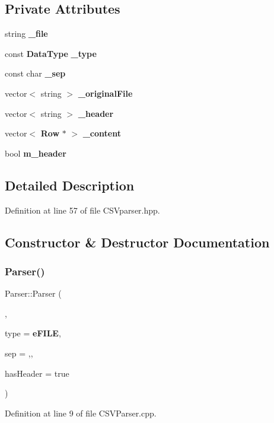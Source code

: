 \subsection*{Private Attributes}
\begin{DoxyCompactItemize}
\item 
string \textbf{ \+\_\+file}
\item 
const \textbf{ Data\+Type} \textbf{ \+\_\+type}
\item 
const char \textbf{ \+\_\+sep}
\item 
vector$<$ string $>$ \textbf{ \+\_\+original\+File}
\item 
vector$<$ string $>$ \textbf{ \+\_\+header}
\item 
vector$<$ \textbf{ Row} $\ast$ $>$ \textbf{ \+\_\+content}
\item 
bool \textbf{ m\+\_\+header}
\end{DoxyCompactItemize}


\subsection{Detailed Description}


Definition at line 57 of file C\+S\+Vparser.\+hpp.



\subsection{Constructor \& Destructor Documentation}
\mbox{\label{class_parser_acdb936b8a1723b1f342dfffbd6df310a}} 
\subsubsection{Parser()}
{\footnotesize\ttfamily Parser\+::\+Parser (\begin{DoxyParamCaption}\item[{const string \&}]{,  }\item[{const \textbf{ Data\+Type} \&}]{type = {\ttfamily \textbf{ e\+F\+I\+LE}},  }\item[{char}]{sep = {\ttfamily \textquotesingle{},\textquotesingle{}},  }\item[{bool}]{has\+Header = {\ttfamily true} }\end{DoxyParamCaption})}



Definition at line 9 of file C\+S\+V\+Parser.\+cpp.



